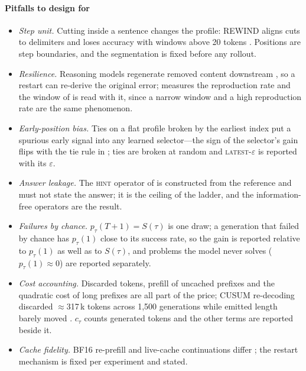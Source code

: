 \paragraph{Pitfalls to design for}
\begin{itemize}[leftmargin=1.1em]
\item \emph{Step unit.} Cutting inside a sentence changes the profile: REWIND aligns cuts to delimiters and loses accuracy with windows above 20 tokens \cite{ding2026rewind}. Positions are step boundaries, and the segmentation is fixed before any rollout.
\item \emph{Resilience.} Reasoning models regenerate removed content downstream \cite{macar2025thoughtbranches}, so a restart can re-derive the original error;  measures the reproduction rate and the window of  is read with it, since a narrow window and a high reproduction rate are the same phenomenon.
\item \emph{Early-position bias.} Ties on a flat profile broken by the earliest index put a spurious early signal into any learned selector---the sign of the selector's gain flips with the tie rule in \citet{atri2026expanding}; ties are broken at random and \textsc{latest-}$\varepsilon$ is reported with its $\varepsilon$.
\item \emph{Answer leakage.} The \textsc{hint} operator of  is constructed from the reference and must not state the answer; it is the ceiling of the ladder, and the information-free operators are the result.
\item \emph{Failures by chance.} $p_\tau(T{+}1)=S(\tau)$ is one draw; a generation that failed by chance has $p_\tau(1)$ close to its success rate, so the gain is reported relative to $p_\tau(1)$ as well as to $S(\tau)$, and problems the model never solves ($p_\tau(1)\approx0$) are reported separately.
\item \emph{Cost accounting.} Discarded tokens, prefill of uncached prefixes and the quadratic cost of long prefixes are all part of the price; CUSUM re-decoding discarded $\approx$317\,k tokens across 1,500 generations while emitted length barely moved \cite{ettifouri2026cusum}. $c_\tau$ counts generated tokens and the other terms are reported beside it.
\item \emph{Cache fidelity.} BF16 re-prefill and live-cache continuations differ \cite{lorup2026stagereplay}; the restart mechanism is fixed per experiment and stated.
\end{itemize}

